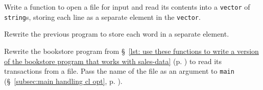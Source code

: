 %
%
\begin{question}
Write a function to open a file for input and read its contents
into a \verb|vector| of \verb|string|s, storing each line as a separate element in the \verb|vector|.
\end{question}

\begin{question}
Rewrite the previous program to store each word in a
separate element.
\end{question}

\begin{question}
Rewrite the bookstore program from \S~\ref{lst: use these functions to write a version of the bookstore program that works with sales-data} (p. \pageref{lst: use these functions to write a version of the bookstore program that works with sales-data}) to read
its transactions from a file. Pass the name of the file as an argument to \verb|main|
(\S~\ref{subsec:main handling cl opt}, p. \pageref{subsec:main handling cl opt}).
\end{question}
